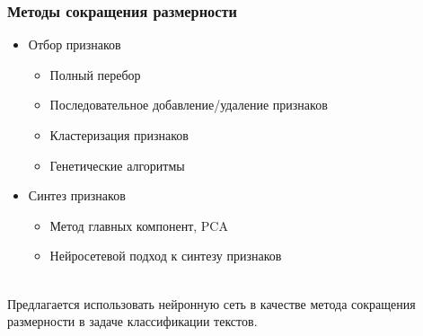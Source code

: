 \documentclass{beamer}
\begin{document}
\begin{frame}
\frametitle{Методы сокращения размерности}
	\begin{itemize}
		\item{Отбор признаков}
			\begin{itemize}
			\item{Полный перебор}
			\item{Последовательное добавление/удаление признаков}
			\item{Кластеризация признаков}
			\item{Генетические алгоритмы}
			\end{itemize}
		\item{Синтез признаков}
			\begin{itemize}
			\item{Метод главных компонент, PCA}
			\item{Нейросетевой подход к синтезу признаков}
			\end{itemize}
	\end{itemize}\leavevmode\newline
	\\Предлагается использовать нейронную сеть в качестве метода сокращения размерности в задаче классификации текстов.
\end{frame}
\end{document}
